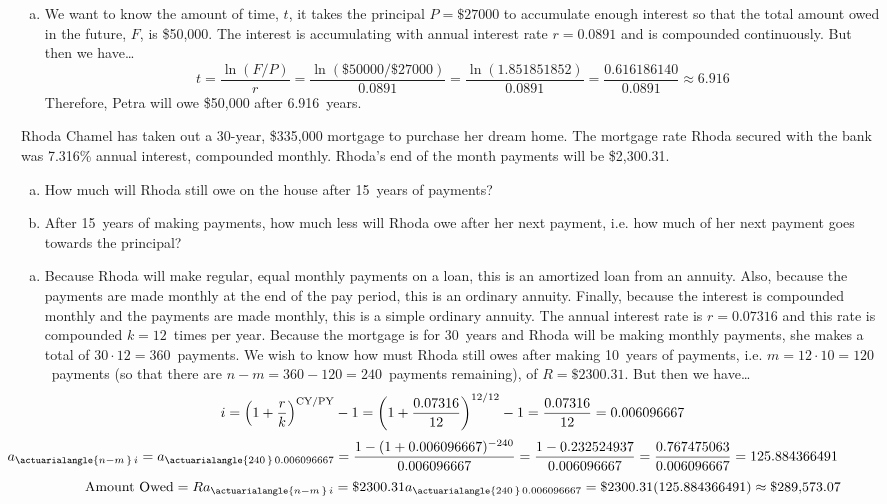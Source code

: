 \documentclass[12pt,letterpaper]{exam}
\begin{document}
\begin{questions}
{\begin{enumerate}[(a)]
\item We want to know the amount of time, $t$, it takes the principal $P= \$27000$ to accumulate enough interest so that the total amount owed in the future, $F$, is \$50,000. The interest is accumulating with annual interest rate $r= 0.0891$ and is compounded continuously. But then we have\dots
	\[
	t= \dfrac{\ln(F/P)}{r}= \dfrac{\ln(\$50000/\$27000)}{0.0891}= \dfrac{\ln(1.851851852)}{0.0891}= \dfrac{0.616186140}{0.0891} \approx 6.916
	\]
Therefore, Petra will owe \$50,000 after 6.916~years.
\end{enumerate}
}



\newpage
\question[10] Rhoda Chamel has taken out a 30-year, \$335,000 mortgage to purchase her dream home. The mortgage rate Rhoda secured with the bank was 7.316\% annual interest, compounded monthly. Rhoda's end of the month payments will be \$2,300.31. 
	\begin{enumerate}[(a)]
	\item How much will Rhoda still owe on the house after 15~years of payments?
	\item After 15~years of making payments, how much less will Rhoda owe after her next payment, i.e. how much of her next payment goes towards the principal? 
	\end{enumerate} \pspace

{\itshape
\sol 
\begin{enumerate}[(a)]
\item Because Rhoda will make regular, equal monthly payments on a loan, this is an amortized loan from an annuity. Also, because the payments are made monthly at the end of the pay period, this is an ordinary annuity. Finally, because the interest is compounded monthly and the payments are made monthly, this is a simple ordinary annuity. The annual interest rate is $r= 0.07316$ and this rate is compounded $k= 12$~times per year. Because the mortgage is for 30~years and Rhoda will be making monthly payments, she makes a total of $30 \cdot 12= 360$~payments. We wish to know how must Rhoda still owes after making 10~years of payments, i.e. $m= 12 \cdot 10= 120$~payments (so that there are $n - m= 360 - 120= 240$~payments remaining), of $R= \$2300.31$. But then we have\dots
	\[
	\hspace{-0.5cm} i= \left(1 + \dfrac{r}{k} \right)^{\text{CY}/\text{PY}} - 1= \left(1 + \dfrac{0.07316}{12} \right)^{12/12} - 1= \dfrac{0.07316}{12}= 0.006096667
	\] 
	\[
	\hspace{-2cm} a_{\actuarialangle{n - m\,}\, i}= a_{\actuarialangle{240\,}\, 0.006096667}= \dfrac{1 - (1 + 0.006096667)^{-240}}{0.006096667}= \dfrac{1 - 0.232524937}{0.006096667}= \dfrac{0.767475063}{0.006096667}= 125.884366491
	\] 
	\[
	\text{Amount Owed}= R a_{\actuarialangle{n - m\,}\, i}= \$2300.31 a_{\actuarialangle{240\,}\, 0.006096667}= \$2300.31(125.884366491) \approx \$289,\!573.07
	\] \pspace


\end{enumerate}}
\end{questions}
\end{document}
